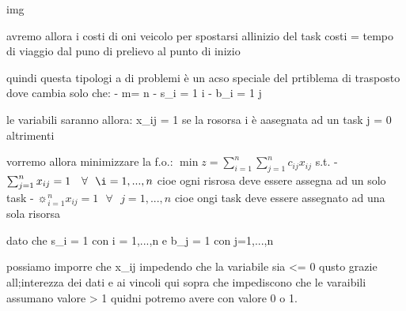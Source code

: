 img

avremo allora i costi di oni veicolo per spostarsi allinizio del task
costi = tempo di viaggio dal puno di prelievo al punto di inizio

quindi questa tipologi a di problemi è un acso speciale del prtiblema di trasposto dove cambia solo che:
- m= n
- s_i = 1 \forall i
- b_i = 1 \forall j


le variabili saranno allora:
x_{ij} = 1 se la rosorsa i è aasegnata ad un task j
= 0 altrimenti

vorremo allora minimizzare la f.o.: $\min z = \sum_{i=1}^n\sum_{j=1}^n c_{ij} x_{ij}$
s.t.
- $\sum_{j=1}^n x_{ij} = 1\ \ \ \forall\ \ \i=1,...,n$ cioe ogni risrosa deve essere assegna ad un solo task
- $\sun_{i=1}^n x_{ij} = 1\ \ \ \forall\ \ \ j=1,...,n$ cioe ongi task deve essere assegnato ad una sola risorsa

dato che s_i = 1 con i = 1,...,n e b_j = 1 con j=1,...,n

possiamo imporre che x_{ij}  impedendo che la variabile sia <= 0 qusto grazie all;interezza dei dati e ai vincoli qui sopra che impediscono che le varaibili assumano valore > 1 quidni potremo avere con valore 0 o 1.











